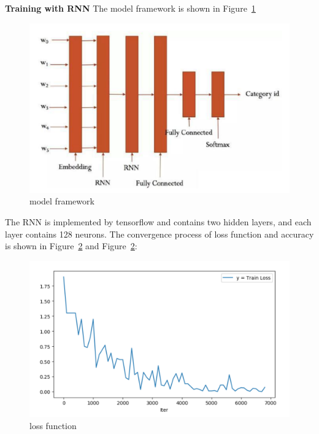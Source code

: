 \documentclass[10pt,twocolumn,letterpaper]{article}
\begin{document}
    \textbf{Training with RNN}
    The model framework is shown in Figure~\ref{fig:3121}
    \begin{figure}[t]
    \begin{center}
    \includegraphics[width=\linewidth]{3121}
    \end{center}
    \vspace{-0.5cm}
       \caption{model framework}
       \label{fig:3121}
    \end{figure}
    The RNN is implemented by tensorflow and contains two hidden layers, and each layer contains 128 neurons.
    The convergence process of loss function and accuracy is shown in Figure~\ref{fig:3122} and Figure~\ref{fig:3122}:
    \begin{figure}[t]
    \begin{center}
    \includegraphics[width=\linewidth]{3122}
    \end{center}
    \vspace{-0.5cm}
       \caption{loss function}
       \label{fig:3122}
    \end{figure}
\end{document}
